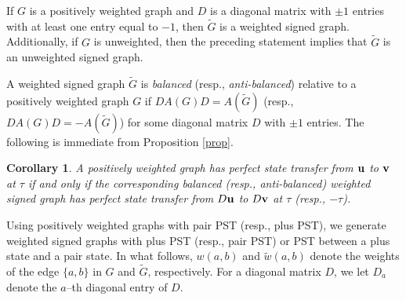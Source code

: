 \documentclass[12pt,a4paper]{article}
\newtheorem{cor}{Corollary}
\def \u {{\bf u}}
\def \v {{\bf v}}
\begin{document}
If $G$ is a positively weighted graph and $D$ is a diagonal matrix with $\pm 1$ entries with at least one entry equal to $-1$, then $\tilde{G}$ is a weighted signed graph. Additionally, if $G$ is unweighted, then the preceding statement implies that $\tilde{G}$ is an unweighted signed graph.

A weighted signed graph $\tilde{G}$ is \textit{balanced} (resp., \textit{anti-balanced}) relative to a positively weighted graph $G$ if $DA(G)D=A(\tilde{G})$ (resp., $DA(G)D=-A(\tilde{G})$) for some diagonal matrix $D$ with $\pm 1$ entries. The following is immediate from Proposition \ref{prop}.

\begin{cor}
\label{bal}
A positively weighted graph has perfect state transfer from $\u$ to $\v$ at $\tau$ if and only if the corresponding balanced (resp., anti-balanced) weighted signed graph has perfect  state transfer from $D\u$ to $D\v$ at $\tau$ (resp., $-\tau$).
\end{cor}

Using positively weighted graphs with pair PST (resp., plus PST), we generate weighted signed graphs with plus PST (resp., pair PST) or PST between a plus state and a pair state. In what follows, $w(a,b)$ and $\tilde{w}(a,b)$ denote the weights of the edge $\{a,b\}$ in $G$ and $\tilde{G}$, respectively. For a diagonal matrix $D$, we let $D_a$ denote the $a$--th diagonal entry of $D$.
\end{document}
